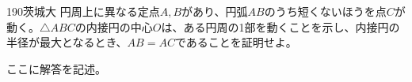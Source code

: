 \begin{prob}{190}{}{茨城大}
 円周上に異なる定点$A, B$があり、円弧$AB$のうち短くないほうを点$C$が動く。$\triangle{ABC}$の内接円の中心$O$は、ある円周の1部を動くことを示し、内接円の半径が最大となるとき、$AB=AC$であることを証明せよ。
\end{prob}
ここに解答を記述。